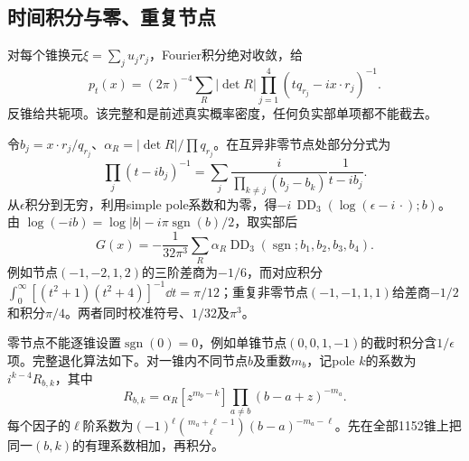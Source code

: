 \documentclass[UTF8,11pt,a4paper,fontset=fandol]{ctexart}
\theoremstyle{remark}\newtheorem{remark}[theorem]{注}
\newcommand{\1}{\mathbf1}\newcommand{\pos}[1]{(#1)_+}
\DeclareMathOperator{\sgn}{sgn}\DeclareMathOperator{\rank}{rank}
\begin{document}
\subsection{时间积分与零、重复节点}
对每个锥换元$\xi=\sum_j u_jr_j$，Fourier积分绝对收敛，给
\begin{equation}\label{eq:ptcones}
 p_t(x)=(2\pi)^{-4}\sum_R|\det R|\prod_{j=1}^4(tq_{r_j}-ix\cdot r_j)^{-1}.
\end{equation}
反锥给共轭项。该完整和是前述真实概率密度，任何负实部单项都不能截去。

令$b_j=x\cdot r_j/q_{r_j}$、$\alpha_R=|\det R|/\prod q_{r_j}$。在互异非零节点处部分分式为
\[
 \prod_j(t-ib_j)^{-1}=\sum_j\frac{i}{\prod_{k\ne j}(b_j-b_k)}\frac1{t-ib_j}.
\]
从$\epsilon$积分到无穷，利用simple pole系数和为零，得$-i\,\operatorname{DD}_3(\log(\epsilon-i\,\cdot);b)$。由
$\log(-ib)=\log|b|-i\pi\sgn(b)/2$，取实部后
\begin{equation}\label{eq:DD}
 G(x)=-\frac1{32\pi^3}\sum_R\alpha_R
 \operatorname{DD}_3(\sgn;b_1,b_2,b_3,b_4).
\end{equation}
例如节点$(-1,-2,1,2)$的三阶差商为$-1/6$，而对应积分$\int_0^\infty[(t^2+1)(t^2+4)]^{-1}\dd t=\pi/12$；重复非零节点$(-1,-1,1,1)$给差商$-1/2$和积分$\pi/4$。两者同时校准符号、$1/32$及$\pi^3$。

零节点不能逐锥设置$\sgn(0)=0$，例如单锥节点$(0,0,1,-1)$的截时积分含$1/\epsilon$项。完整退化算法如下。对一锥内不同节点$b$及重数$m_b$，记pole $k$的系数为$i^{k-4}R_{b,k}$，其中
\begin{equation}\label{eq:residue}
 R_{b,k}=\alpha_R[z^{m_b-k}]\prod_{a\ne b}(b-a+z)^{-m_a}.
\end{equation}
每个因子的$\ell$阶系数为$(-1)^\ell\binom{m_a+\ell-1}{\ell}(b-a)^{-m_a-\ell}$。先在全部1152锥上把同一$(b,k)$的有理系数相加，再积分。
\end{document}
